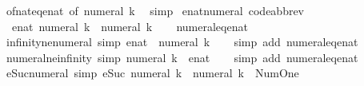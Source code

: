 \begin{isabellebody}
%
\isatagproof
{}\isamarkupfalse%
\ of{\isacharunderscore}nat{\isacharunderscore}eq{\isacharunderscore}enat\ {\isacharbrackleft}of\ {\isachardoublequoteopen}numeral\ k{\isachardoublequoteclose}{\isacharbrackright}\ \isamarkupfalse%
\ simp%
\endisatagproof
{\isafoldproof}%
%
\isadelimproof
\isanewline
%
\endisadelimproof
\isanewline
{}\isamarkupfalse%
\ enat{\isacharunderscore}numeral\ {\isacharbrackleft}code{\isacharunderscore}abbrev{\isacharbrackright}{\isacharcolon}\isanewline
\ \ {\isachardoublequoteopen}enat\ {\isacharparenleft}numeral\ k{\isacharparenright}\ {\isacharequal}\ numeral\ k{\isachardoublequoteclose}\isanewline
%
\isadelimproof
\ \ %
\endisadelimproof
%
\isatagproof
{}\isamarkupfalse%
\ numeral{\isacharunderscore}eq{\isacharunderscore}enat\ \isacommand{{\isachardot}{\isachardot}}\isamarkupfalse%
%
\endisatagproof
{\isafoldproof}%
%
\isadelimproof
\isanewline
%
\endisadelimproof
\isanewline
{}\isamarkupfalse%
\ infinity{\isacharunderscore}ne{\isacharunderscore}numeral\ {\isacharbrackleft}simp{\isacharbrackright}{\isacharcolon}\ {\isachardoublequoteopen}{\isacharparenleft}{\isasyminfinity}{\isacharcolon}{\isacharcolon}enat{\isacharparenright}\ {\isasymnoteq}\ numeral\ k{\isachardoublequoteclose}\isanewline
%
\isadelimproof
\ \ %
\endisadelimproof
%
\isatagproof
{}\isamarkupfalse%
\ {\isacharparenleft}simp\ add{\isacharcolon}\ numeral{\isacharunderscore}eq{\isacharunderscore}enat{\isacharparenright}%
\endisatagproof
{\isafoldproof}%
%
\isadelimproof
\isanewline
%
\endisadelimproof
\isanewline
{}\isamarkupfalse%
\ numeral{\isacharunderscore}ne{\isacharunderscore}infinity\ {\isacharbrackleft}simp{\isacharbrackright}{\isacharcolon}\ {\isachardoublequoteopen}numeral\ k\ {\isasymnoteq}\ {\isacharparenleft}{\isasyminfinity}{\isacharcolon}{\isacharcolon}enat{\isacharparenright}{\isachardoublequoteclose}\isanewline
%
\isadelimproof
\ \ %
\endisadelimproof
%
\isatagproof
{}\isamarkupfalse%
\ {\isacharparenleft}simp\ add{\isacharcolon}\ numeral{\isacharunderscore}eq{\isacharunderscore}enat{\isacharparenright}%
\endisatagproof
{\isafoldproof}%
%
\isadelimproof
\isanewline
%
\endisadelimproof
\isanewline
{}\isamarkupfalse%
\ eSuc{\isacharunderscore}numeral\ {\isacharbrackleft}simp{\isacharbrackright}{\isacharcolon}\ {\isachardoublequoteopen}eSuc\ {\isacharparenleft}numeral\ k{\isacharparenright}\ {\isacharequal}\ numeral\ {\isacharparenleft}k\ {\isacharplus}\ Num{\isachardot}One{\isacharparenright}{\isachardoublequoteclose}\isanewline

\end{isabellebody}
